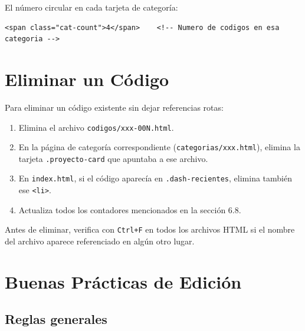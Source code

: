 \documentclass[12pt, a4paper]{article}
\newcommand{\archivo}[1]{\texttt{\textcolor{cpAccent}{#1}}}
\newcommand{\clase}[1]{\texttt{\textcolor{cpAzul}{.#1}}}
\newcommand{\etiquetaHtml}[1]{\texttt{\textcolor{cpKeyword}{<#1>}}}
\begin{document}
El número circular en cada tarjeta de categoría:

\begin{lstlisting}[style=htmlstyle]
<span class="cat-count">4</span>    <!-- Numero de codigos en esa categoria -->
\end{lstlisting}


\section{Eliminar un Código}

Para eliminar un código existente sin dejar referencias rotas:

\begin{enumerate}[leftmargin=1.5em]
    \item Elimina el archivo \archivo{codigos/xxx-00N.html}.
    \item En la página de categoría correspondiente (\archivo{categorias/xxx.html}),
          elimina la tarjeta \clase{proyecto-card} que apuntaba a ese archivo.
    \item En \archivo{index.html}, si el código aparecía en \clase{dash-recientes},
          elimina también ese \etiquetaHtml{li}.
    \item Actualiza todos los contadores mencionados en la sección 6.8.
\end{enumerate}

\begin{cajaAviso}
    Antes de eliminar, verifica con \texttt{Ctrl+F} en todos los archivos HTML
    si el nombre del archivo aparece referenciado en algún otro lugar.
\end{cajaAviso}


\section{Buenas Prácticas de Edición}

\subsection{Reglas generales}
\end{document}
